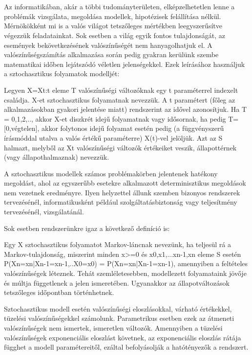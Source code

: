\chapter{\bevezetes}
Az informatikában, akár a többi tudományterületen, elképzelhetetlen lenne a problémák vizsgálata, megoldása modellek, hipotézisek felállítása nélkül. Mérnökökként mi is a valós világot tetszőleges mértékben leegyszerűsítve végezzük feladatainkat. Sok esetben a világ egyik fontos tulajdonságát, az események bekövetkezésének valószínűségét nem hanyagolhatjuk el. A valószínűségszámítás alkalmazása során pedig gyakran kerülünk szembe matematikai időben lejátszódó véletlen jelenségekkel. Ezek leírásához használjuk a sztochasztikus folyamatok modelljét:

Legyen X={Xt:t eleme T} valószínűségi változóknak egy t paraméterrel indexelt családja. X-et sztochasztikus folyamatnak nevezzük. A t paramétert (főleg az alkalmazásokban gyakori jelentése miatt) rendszerint az idővel azonosítjuk. Ha T = {0,1,2,..}, akkor X-et diszkrét idejű folyamatnak vagy idősornak, ha pedig T=[0,végtelen], akkor folytonos idejű folyamat esetén pedig (a függvényszerű írásmóddal utalva a valós értékű paraméterre) X(t)-vel jelöljük. Azt az S halmazt, melyből az Xt valószínűségi változók értékeiket veszik, állapottérnek (vagy állapothalmaznak) nevezzük.

A sztochasztikus modellek számos problémakörben jelentenek hatékony megoldást, ahol az egyszerűbb esetekre alkalmazott determinisztikus megoldások nem vezetnek eredményre.
Ilyen helyzettel állunk szemben bizonyos rendszerek tervezésénél, informatikusként például szolgáltatásbiztonság vagy teljesítmény tervezésénél, vizsgálatánál.

Sok esetben rendszerünkre igaz a következő definíció is:

Egy X sztochasztikus folyamatot Markov-láncnak nevezünk, ha teljesül rá a Markov-tulajdonság, miszerint minden x>=0 és x0,x1,...xn-1,xn eleme S esetén
P(Xn=xn|Xn-1=xn-1,..X0=x0) = P(Xn=xn|Xn-1=xn-1), amennyiben a feltételes valószínűségek léteznek.\cite{MarkovLancokKonyv}
Tehát szemléletesebben, modellezett folyamataink jövője és múltja függetlenek a jelen ismeretében. Ugyanakkor az állapotváltozások tetszőleges időpontban történhetnek.

Sztochasztikus modell esetén valószínűségi eloszlásokkal, várható értékekkel, tüzelési valószínűségekkel számolunk. Parametrikus esetben ezek az átmeneti valószínűségek nem ismertek, ismeretlen változók. Amennyiben a  tüzelési valószínűségek exponenciális eloszlást követnek, az exponenciális eloszlás rátája függhet a modell paramétereitől, ezáltal befolyásolják a hatótényezők a rendszert.

